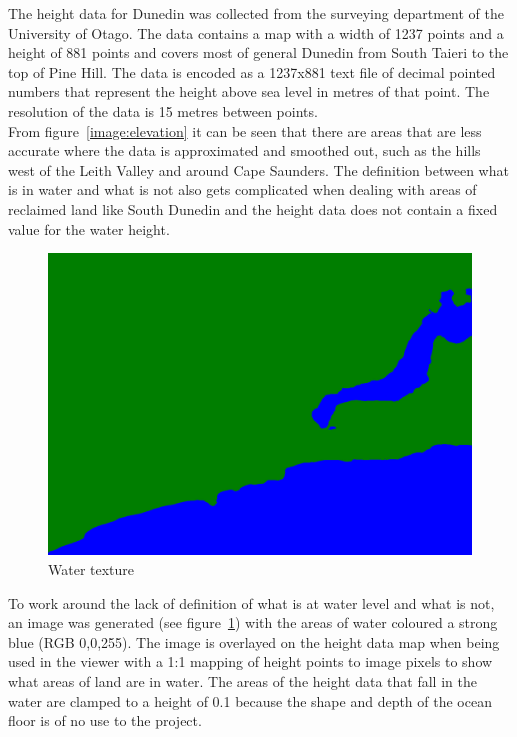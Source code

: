 \documentclass[12pt]{report}
\begin{document}
The height data for Dunedin was collected from the surveying department of the University of Otago. The data contains a map with a width of 1237 points and a height of 881 points and covers most of general Dunedin from South Taieri to the top of Pine Hill. The data is encoded as a 1237x881 text file of decimal pointed numbers that represent the height above sea level in metres of that point. The resolution of the data is 15 metres between points.\\

From figure~\ref{image:elevation} it can be seen that there are areas that are less accurate where the data is approximated and smoothed out, such as the hills west of the Leith Valley and around Cape Saunders. The definition between what is in water and what is not also gets complicated when dealing with areas of reclaimed land like South Dunedin and the height data does not contain a fixed value for the water height.\\

\begin{figure}
\includegraphics[scale=0.25]{terrain.png}
\caption{Water texture}
\label{image:overlaytexture}
\end{figure}
To work around the lack of definition of what is at water level and what is not, an image was generated (see figure~\ref{image:overlaytexture}) with the areas of water coloured a strong blue (RGB 0,0,255). The image is overlayed on the height data map when being used in the viewer with a 1:1 mapping of height points to image pixels to show what areas of land are in water. The areas of the height data that fall in the water are clamped to a height of 0.1 because the shape and depth of the ocean floor is of no use to the project.\\
\end{document}
